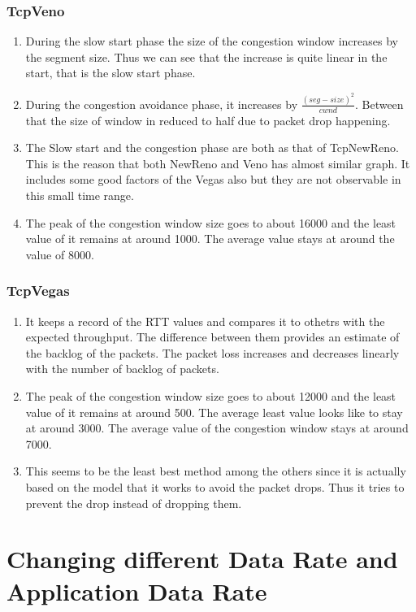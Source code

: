 \documentclass{article}
\begin{document}
\subsubsection{TcpVeno}
\begin{enumerate}
    \item During the slow start phase the size of the congestion window increases by the segment size. Thus we can see that the increase is quite linear in the start, that is the slow start phase.
    \item During the congestion avoidance phase, it increases by $\frac{(seg-size)^2}{cwnd}$. Between that the size of window in reduced to half due to packet drop happening.
    \item The Slow start and the congestion phase are both as that of TcpNewReno. This is the reason that both NewReno and Veno has almost similar graph. It includes some good factors of the Vegas also but they are not observable in this small time range.
    \item The peak of the congestion window size goes to about 16000 and the least value of it remains at around 1000. The average value stays at around the value of 8000.
\end{enumerate}
\subsubsection{TcpVegas}
\begin{enumerate}
    \item It keeps a record of the RTT values and compares it to othetrs with the expected throughput. The difference between them provides an estimate of the backlog of the packets. The packet loss increases and decreases linearly with the number of backlog of packets.
    \item The peak of the congestion window size goes to about 12000 and the least value of it remains at around 500. The average least value looks like to stay at around 3000. The average value of the congestion window stays at around 7000. 
    \item This seems to be the least best method among the others since it is actually based on the model that it works to avoid the packet drops. Thus it tries to prevent the drop instead of dropping them.
\end{enumerate}

\section{Changing different Data Rate and Application Data Rate}
\end{document}
